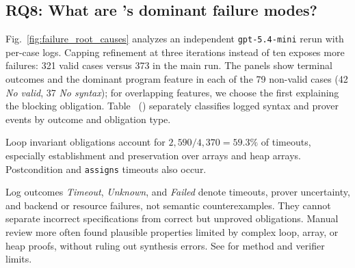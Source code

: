 
\subsection{RQ8: What are \toolname's dominant failure modes?}
\label{subsec:rq8-failure}

Fig.~\ref{fig:failure_root_causes} analyzes an independent
\texttt{gpt-5.4-mini} rerun with per-case logs. Capping refinement at three
iterations instead of ten exposes more failures: 321 valid cases versus 373
in the main run. The panels show terminal outcomes and the dominant program
feature in each of the 79 non-valid cases (42 \emph{No valid}, 37 \emph{No
syntax}); for overlapping features, we choose the first explaining the
blocking obligation. Table~
() separately classifies logged syntax and prover
events by outcome and obligation type.

Loop invariant obligations account for \(2{,}590/4{,}370=59.3\%\) of
timeouts, especially establishment and preservation over arrays and heap
arrays. Postcondition and \texttt{assigns} timeouts also occur.

{Log outcomes \emph{Timeout}, \emph{Unknown}, and \emph{Failed} denote
timeouts, prover uncertainty, and backend or resource failures, not semantic
counterexamples. They cannot separate incorrect specifications from correct
but unproved obligations. Manual review more often found plausible properties
limited by complex loop, array, or heap proofs, without ruling out synthesis
errors.} See {} for method and verifier limits.

